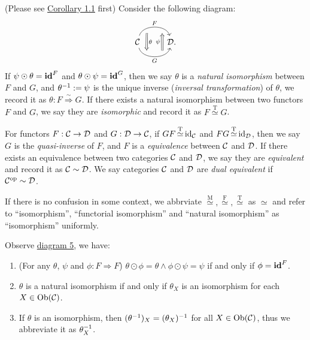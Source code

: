 \documentclass{article}
\begin{document}
\begin{defi}
	(Please see \hyperref[identity transformation]{Corollary 1.1} first) Consider the following diagram:
	\begin{equation}\begin{tikzcd}\label{iso}
		\ca 
		\arrow[r, bend left =75, "F", ""' {name=U1, near start}, ""' {name=U2, near end}]
		\arrow[r, bend right=75, "G"', "" {name=D1, near start}, ""  {name=D2, near end}]
		& \D.
		\arrow[Rightarrow, "\theta", from=U1, to=D1]
		\arrow[Rightarrow, "\psi"  , from=D2, to=U2]
    \end{tikzcd}\end{equation}
	If $\psi\odot\theta=\mathbf{id}^F$ and $\theta\odot\psi=\mathbf{id}^G$, then we say $\theta$ is a \emph{natural isomorphism} between $F$ and $G$, and $\theta^{-1}:=\psi$ is the unique inverse (\emph{inversal transformation}) of $\theta$, we record it as $\theta:F\mathop{\Rightarrow}\limits^{\sim}G$. If there exists a natural isomorphism between two functors $F$ and $G$, we say they are \emph{isomorphic} and record it as $F\mathop{\simeq}\limits^\mathrm{T}G$.
	
	For functors $F:\mathcal{C}\to\mathcal{D}$ and $G:\mathcal{D}\to\mathcal{C}$, if $GF\mathop{\simeq}\limits^\mathrm{T}\mathrm{id}_{\mathcal{C}}$ and $FG\mathop{\simeq}\limits^\mathrm{T}\mathrm{id}_{\mathcal{D}}$, then we say $G$ is the \emph{quasi-inverse} of $F$, and $F$ is a \emph{equivalence} between $\mathcal{C}$ and $\mathcal{D}$. If there exists an equivalence between two categories $\mathcal{C}$ and $\mathcal{D}$, we say they are \emph{equivalent} and record it as $\mathcal{C}\sim\mathcal{D}$. We say categories $\mathcal{C}$ and $\mathcal{D}$ are \emph{dual equivalent} if $\mathcal{C}^\mathrm{op}\sim\mathcal{D}$.
	
	If there is no confusion in some context, we abbrviate $\mathop{\simeq}\limits^\mathrm{M},\mathop{\simeq}\limits^\mathrm{F},\mathop{\simeq}\limits^\mathrm{T}$ as $\simeq$ and refer to ``isomorphism'', ``functorial isomorphism'' and ``natural isomorphism'' as ``isomorphism'' uniformly.
\end{defi}


\begin{cor}\label{identity transformation}
	Observe \hyperref[iso]{diagram 5}, we have:
	\begin{enumerate}
		\item (For any $\theta$, $\psi$ and $\phi:F\Rightarrow F$) $\theta\odot\phi=\theta\wedge\phi\odot\psi=\psi$ if and only if $\phi=\mathbf{id}^F$.
		\item $\theta$ is a natural isomorphism if and only if $\theta_X$ is an isomorphism for each $X\in\mathrm{Ob}(\mathcal{C})$.
		\item If $\theta$ is an isomorphism, then $(\theta^{-1})_X=(\theta_X)^{-1}$ for all $X\in\mathrm{Ob}(\mathcal{C})$, thus we abbreviate it as $\theta^{-1}_X$.
	\end{enumerate}
\end{cor}
\end{document}

